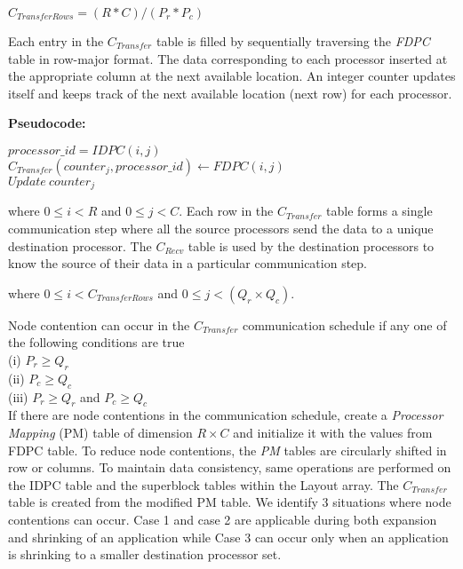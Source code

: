\documentclass[letterpaper]{llncs}
\begin{document}
\begin{description}
\hspace{1.3in}$C_{TransferRows} = (R\ast C)/(P_{r}\ast P_{c})$ 

Each entry in the $C_{Transfer}$ table is filled by sequentially traversing the \textit{FDPC} table in row-major format. 
The data corresponding to each processor  inserted at the appropriate column at the next available location. 
An integer counter updates itself and keeps track of the next available location (next row) for each processor.

\textbf{Pseudocode:}
\begin{tabbing}
\hspace{0.4in}$processor\_id = IDPC(i, j)$ \\
\hspace{0.4in}$C_{Transfer}(counter_{j}, processor\_id) \leftarrow FDPC(i,j)$ \\
\hspace{0.4in}$Update\ counter_{j}$
\end{tabbing}

where $0\leq i < R$ and $0 \leq j < C$.
Each row in the $C_{Transfer}$ table forms a single communication step where all the source processors send the 
data to a unique destination processor. The $C_{Recv}$ table is used by the destination processors to know the 
source of their data in a particular communication step.


where $0 \leq i< C_{TransferRows}$ and  $0 \leq j < (Q_{r} \times Q_{c})$.

Node contention can occur in the $C_{Transfer}$ communication schedule if any one of the following conditions are true\\
(i)   $P_{r} \ge Q_{r}$ \\
(ii)  $P_{c} \ge Q_{c}$ \\
(iii) $P_{r} \ge Q_{r}$ and $P_{c} \ge Q_{c}$\\

If there are node contentions in the communication schedule, create a \textit{Processor Mapping} (PM) table  of dimension $R\times C$ and initialize it with the values from FDPC table.
To reduce node contentions, the \textit{PM} tables are circularly shifted in row or columns. To maintain data consistency, same operations 
are performed on the IDPC table and the superblock tables within the Layout array.
The $C_{Transfer}$ table is created from the modified PM table.
We identify 3 situations where node contentions can occur.
Case 1 and case 2 are applicable during both expansion and shrinking of an application 
while Case 3 can occur only when an application is shrinking to a smaller  destination processor set.


\end{description}
\end{document}
